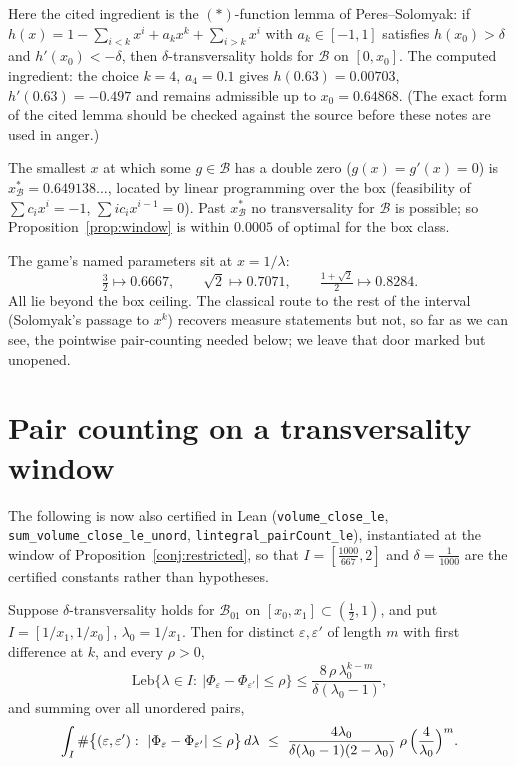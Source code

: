 \documentclass[11pt]{amsart}
\theoremstyle{remark}\newtheorem{remark}[lemma]{Remark}
\begin{document}
Here the cited ingredient is the $(*)$-function lemma of
Peres--Solomyak: if $h(x)=1-\sum_{i<k}x^i+a_kx^k+\sum_{i>k}x^i$ with
$a_k\in[-1,1]$ satisfies $h(x_0)>\delta$ and $h'(x_0)<-\delta$, then
$\delta$-transversality holds for $\mathcal B$ on $[0,x_0]$. The computed
ingredient: the choice $k=4$, $a_4=0.1$ gives $h(0.63)=0.00703$,
$h'(0.63)=-0.497$ and remains admissible up to $x_0=0.64868$. (The exact
form of the cited lemma should be checked against the source before these
notes are used in anger.)

\begin{proposition}[computed]\label{prop:ceiling}
The smallest $x$ at which some $g\in\mathcal B$ has a double zero
($g(x)=g'(x)=0$) is $x^*_{\mathcal B}=0.649138\ldots$, located by linear
programming over the box (feasibility of $\sum c_ix^i=-1$,
$\sum ic_ix^{i-1}=0$). Past $x^*_{\mathcal B}$ no transversality for
$\mathcal B$ is possible; so Proposition~\ref{prop:window} is within $0.0005$
of optimal for the box class.
\end{proposition}

The game's named parameters sit at $x=1/\lambda$:
\[
\tfrac32\mapsto0.6667,\qquad \sqrt2\mapsto0.7071,\qquad
\tfrac{1+\sqrt2}2\mapsto0.8284 .
\]
All lie beyond the box ceiling. The classical route to the rest of the
interval (Solomyak's passage to $x^k$) recovers measure statements but not,
so far as we can see, the pointwise pair-counting needed below; we leave that
door marked but unopened.

\section{Pair counting on a transversality window}

The following is now also certified in Lean (\texttt{volume\_close\_le},
\texttt{sum\_volume\_close\_le\_unord}, \texttt{lintegral\_pairCount\_le}),
instantiated at the window of Proposition~\ref{conj:restricted}, so that
$I=[\tfrac{1000}{667},2]$ and $\delta=\tfrac1{1000}$ are the certified
constants rather than hypotheses.

\begin{proposition}\label{prop:pairs}
Suppose $\delta$-transversality holds for $\mathcal B_{01}$ on
$[x_0,x_1]\subset(\tfrac12,1)$, and put $I=[1/x_1,1/x_0]$,
$\lambda_0=1/x_1$. Then for distinct $\varepsilon,\varepsilon'$ of length $m$
with first difference at $k$, and every $\rho>0$,
\[
\mathrm{Leb}\bigl\{\lambda\in I:\ |\Phi_\varepsilon-\Phi_{\varepsilon'}|\leq\rho\bigr\}
\leq\frac{8\,\rho\,\lambda_0^{k-m}}{\delta(\lambda_0-1)},
\]
and summing over all unordered pairs,
\[
\int_I\#\bigl\{(\varepsilon,\varepsilon'):\
|\Phi_\varepsilon-\Phi_{\varepsilon'}|\leq\rho\bigr\}\,d\lambda
\ \leq\ \frac{4\lambda_0}{\delta(\lambda_0-1)(2-\lambda_0)}\;
\rho\,\Bigl(\frac{4}{\lambda_0}\Bigr)^{m}.
\]
\end{proposition}
\end{document}
